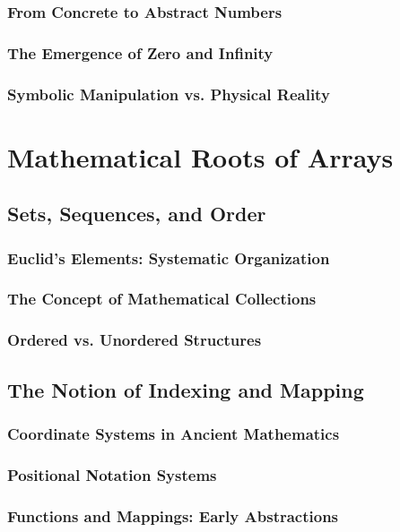 \documentclass[12pt, oneside]{book}
\begin{document}
\subsubsection{From Concrete to Abstract Numbers}
\subsubsection{The Emergence of Zero and Infinity}
\subsubsection{Symbolic Manipulation vs. Physical Reality}

\section{Mathematical Roots of Arrays}
\subsection{Sets, Sequences, and Order}
\subsubsection{Euclid's Elements: Systematic Organization}
\subsubsection{The Concept of Mathematical Collections}
\subsubsection{Ordered vs. Unordered Structures}

\subsection{The Notion of Indexing and Mapping}
\subsubsection{Coordinate Systems in Ancient Mathematics}
\subsubsection{Positional Notation Systems}
\subsubsection{Functions and Mappings: Early Abstractions}
\end{document}
